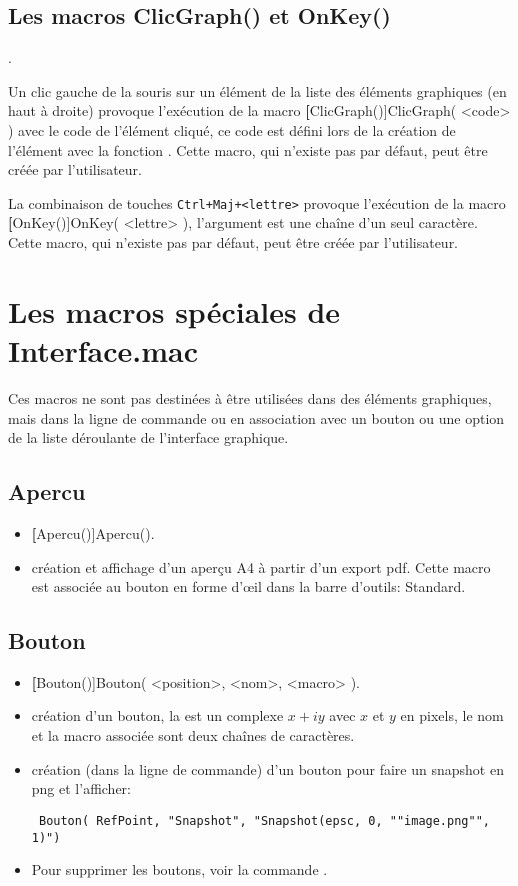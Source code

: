 \subsection{Les macros ClicGraph() et OnKey()}.
 
Un clic gauche de la souris sur un élément de la liste des éléments graphiques (en haut à droite) provoque l'exécution de la macro \textbf[ClicGraph()]{ClicGraph( <code> )} avec le code de l'élément cliqué, ce code est défini lors de la création de l'élément avec la fonction . Cette macro, qui n'existe pas par défaut, peut être créée par l'utilisateur.

La combinaison de touches \verb|Ctrl+Maj+<lettre>| provoque l'exécution de la macro \textbf[OnKey()]{OnKey( <lettre> )}, l'argument est une chaîne d'un seul caractère. Cette macro, qui n'existe pas par défaut, peut être créée par l'utilisateur.


\section{Les macros spéciales de Interface.mac}

Ces macros ne sont pas destinées à être utilisées dans des éléments graphiques, mais dans la ligne de commande ou en
association avec un bouton ou une option de la liste déroulante de l'interface graphique.

\subsection{Apercu}

\begin{itemize}
 \item \util \textbf[Apercu()]{Apercu()}.
 \item \desc création et affichage d'un aperçu A4 à partir d'un export pdf. Cette macro est associée au bouton en forme d'œil dans la barre d'outils: Standard.
\end{itemize}


\subsection{Bouton}

\begin{itemize}
 \item \util \textbf[Bouton()]{Bouton( <position>, <nom>, <macro> )}.
 \item \desc création d'un bouton, la  est un complexe $x+iy$ avec $x$ et $y$ en pixels, le nom et la macro associée sont deux chaînes de caractères.
 \item \exem création (dans la ligne de commande) d'un bouton pour faire un snapshot en png et l'afficher:

\begin{verbatim}
 Bouton( RefPoint, "Snapshot", "Snapshot(epsc, 0, ""image.png"", 1)")
\end{verbatim}

 \item Pour supprimer les boutons, voir la commande .

\end{itemize}

